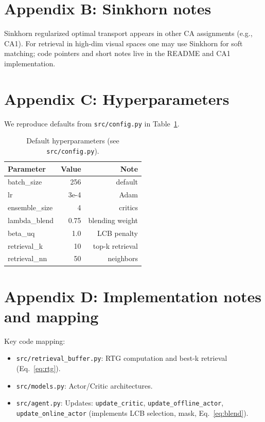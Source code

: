 \documentclass{article}
\begin{document}
\section{Appendix B: Sinkhorn notes}

Sinkhorn regularized optimal transport appears in other CA assignments (e.g., CA1). For retrieval in high-dim visual spaces one may use Sinkhorn for soft matching; code pointers and short notes live in the README and CA1 implementation.

\section{Appendix C: Hyperparameters}

We reproduce defaults from \texttt{src/config.py} in Table~\ref{tab:hp}.

\begin{table}[ht]
  \centering
  \begin{tabular}{lrr}
    \toprule
    Parameter & Value & Note \\
    \midrule
    batch\_size & 256 & default \\
    lr & 3e-4 & Adam \\
    ensemble\_size & 4 & critics \\
    lambda\_blend & 0.75 & blending weight \\
    beta\_uq & 1.0 & LCB penalty \\
    retrieval\_k & 10 & top-k retrieval \\
    retrieval\_nn & 50 & neighbors \\
    \bottomrule
  \end{tabular}
  \caption{Default hyperparameters (see \texttt{src/config.py}).}
  \label{tab:hp}
\end{table}

\section{Appendix D: Implementation notes and mapping}

Key code mapping:
\begin{itemize}
  \item \texttt{src/retrieval_buffer.py}: RTG computation and best-k retrieval (Eq.~\ref{eq:rtg}).
  \item \texttt{src/models.py}: Actor/Critic architectures.
  \item \texttt{src/agent.py}: Updates: \texttt{update_critic}, \texttt{update_offline_actor}, \texttt{update_online_actor} (implements LCB selection, mask, Eq.~\ref{eq:blend}).
\end{itemize}
\end{document}

